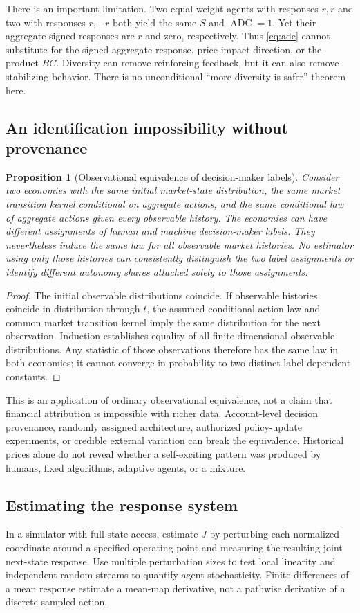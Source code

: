 \documentclass[11pt,a4paper]{article}
\newtheorem{proposition}[theorem]{Proposition}
\theoremstyle{definition}
\theoremstyle{remark}
\newcommand{\ADC}{\operatorname{ADC}}
\begin{document}
There is an important limitation. Two equal-weight agents with responses $r,r$ and two with responses $r,-r$ both yield the same $S$ and $\ADC=1$. Yet their aggregate signed responses are $r$ and zero, respectively. Thus \cref{eq:adc} cannot substitute for the signed aggregate response, price-impact direction, or the product $BC$. Diversity can remove reinforcing feedback, but it can also remove stabilizing behavior. There is no unconditional ``more diversity is safer'' theorem here.

\subsection{An identification impossibility without provenance}
\begin{proposition}[Observational equivalence of decision-maker labels]
\label{prop:identification}
Consider two economies with the same initial market-state distribution, the same market transition kernel conditional on aggregate actions, and the same conditional law of aggregate actions given every observable history. The economies can have different assignments of human and machine decision-maker labels. They nevertheless induce the same law for all observable market histories. No estimator using only those histories can consistently distinguish the two label assignments or identify different autonomy shares attached solely to those assignments.
\end{proposition}
\begin{proof}
The initial observable distributions coincide. If observable histories coincide in distribution through $t$, the assumed conditional action law and common market transition kernel imply the same distribution for the next observation. Induction establishes equality of all finite-dimensional observable distributions. Any statistic of those observations therefore has the same law in both economies; it cannot converge in probability to two distinct label-dependent constants.
\end{proof}
This is an application of ordinary observational equivalence, not a claim that financial attribution is impossible with richer data. Account-level decision provenance, randomly assigned architecture, authorized policy-update experiments, or credible external variation can break the equivalence. Historical prices alone do not reveal whether a self-exciting pattern was produced by humans, fixed algorithms, adaptive agents, or a mixture.

\subsection{Estimating the response system}
In a simulator with full state access, estimate $J$ by perturbing each normalized coordinate around a specified operating point and measuring the resulting joint next-state response. Use multiple perturbation sizes to test local linearity and independent random streams to quantify agent stochasticity. Finite differences of a mean response estimate a mean-map derivative, not a pathwise derivative of a discrete sampled action.
\end{document}
